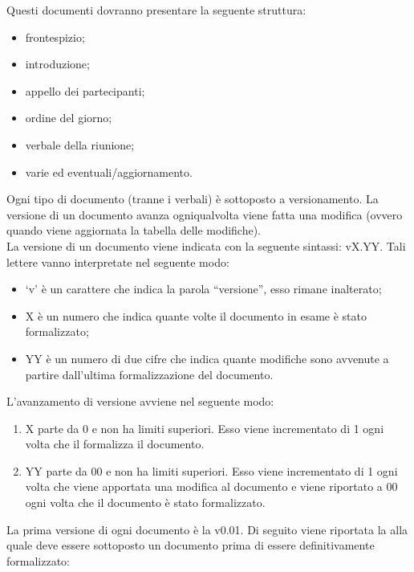 						Questi documenti dovranno presentare la seguente struttura:
						\begin{itemize}
							\item frontespizio;
							\item introduzione;
							\item appello dei partecipanti;
							\item ordine del giorno;
							\item verbale della riunione;
							\item varie ed eventuali/aggiornamento.
						\end{itemize}
			 \label{sec:versioni}
				Ogni tipo di documento (tranne i verbali) è sottoposto a versionamento. La versione di un documento avanza ogniqualvolta viene fatta una modifica (ovvero quando viene aggiornata la tabella delle modifiche).\\
				La versione di un documento viene indicata con la seguente sintassi: vX.YY. Tali lettere vanno interpretate nel seguente modo:
				\begin{itemize}
					\item ‘v’ è un carattere che indica la parola “versione”, esso rimane inalterato;
					\item X è un numero che indica quante volte il documento in esame è stato formalizzato;
					\item YY è un numero di due cifre che indica quante modifiche sono avvenute a partire dall’ultima formalizzazione del documento.
				\end{itemize}
				L’avanzamento di versione avviene nel seguente modo:
				\begin{enumerate}
					\item X parte da 0 e non ha limiti superiori. Esso viene incrementato di 1 ogni volta che il  formalizza il documento.
					\item YY parte da 00 e non ha limiti superiori. Esso viene incrementato di 1 ogni volta che viene apportata una modifica al documento e viene riportato a 00 ogni volta che il documento è stato formalizzato.
				\end{enumerate}
				La prima versione di ogni documento è la v0.01.
				Di seguito viene riportata la  alla quale deve essere sottoposto un documento prima di essere definitivamente formalizzato:
